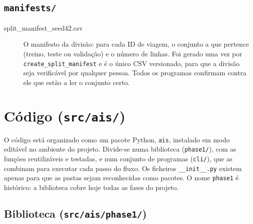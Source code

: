 \documentclass[11pt,a4paper]{article}
\newcommand{\f}[1]{\texttt{#1}}
\begin{document}
\subsection{\f{manifests/}}

\begin{description}
\item[split\_manifest\_seed42.csv] O manifesto da divisão: para cada ID de viagem, o conjunto a que
  pertence (treino, teste ou validação) e o número de linhas. Foi gerado uma vez por
  \f{create\_split\_manifest} e é o único CSV versionado, para que a divisão seja verificável por
  qualquer pessoa. Todos os programas confirmam contra ele que estão a ler o conjunto certo.
\end{description}

\section{Código (\f{src/ais/})}\label{sec:codigo}

O código está organizado como um pacote Python, \f{ais}, instalado em modo editável no ambiente do
projeto. Divide-se numa biblioteca (\f{phase1/}), com as funções reutilizáveis e testadas, e num
conjunto de programas (\f{cli/}), que as combinam para executar cada passo do fluxo. Os ficheiros
\f{\_\_init\_\_.py} existem apenas para que as pastas sejam reconhecidas como pacotes. O nome
\f{phase1} é histórico: a biblioteca cobre hoje todas as fases do projeto.

\subsection{Biblioteca (\f{src/ais/phase1/})}
\end{document}
